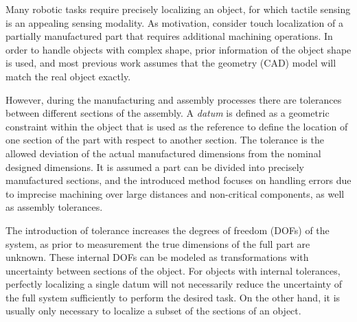 \documentclass[../thesis.tex]{subfiles}
\begin{document}

Many robotic tasks require precisely localizing an object, for which tactile sensing is an appealing sensing modality.
As motivation, consider touch localization of a partially manufactured part that requires additional machining operations.
In order to handle objects with complex shape, prior information of the object shape is used, and most previous work assumes that the geometry (CAD) model will match the real object exactly.


However, during the manufacturing and assembly processes there are tolerances between different sections of the assembly. A \textit{datum} is defined as a geometric constraint within the object that is used as the reference to define the location of one section of the part with respect to another section. The tolerance is the allowed deviation of the actual manufactured dimensions from the nominal designed dimensions.
It is assumed a part can be divided into precisely manufactured sections, and the introduced method focuses on handling errors due to imprecise machining over large distances and non-critical components, as well as assembly tolerances.

The introduction of tolerance increases the degrees of freedom (DOFs) of the system, as prior to measurement the true dimensions of the full part are unknown. 
These internal DOFs can be modeled as transformations with uncertainty between sections of the object.
For objects with internal tolerances, perfectly localizing a single datum will not necessarily reduce the uncertainty of the full system sufficiently to perform the desired task.
On the other hand, it is usually only necessary to localize a subset of the sections of an object.
\end{document}
